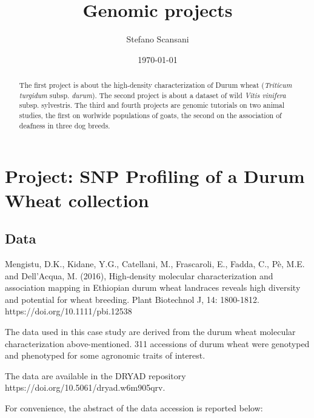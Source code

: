 \documentclass[a4paper,onecolumn,10pt]{article}
\begin{document}
\title{Genomic projects}
\author{Stefano Scansani}
\date{\today}
\maketitle
\begin{abstract}

    The first project is about the high-density characterization of Durum wheat (\textit{Triticum turgidum} subsp. \textit{durum}).
    The second project is about a dataset of wild \textit{Vitis vinifera} subsp. sylvestris.
    The third and fourth projects are genomic tutorials on two animal studies, the first on worlwide populations of goats, the second on the association of deafness in three dog breeds.

\end{abstract}
\tableofcontents
\listoffigures
\listoftables


\section{Project: SNP Profiling of a Durum Wheat collection}

\subsection{Data}

Mengistu, D.K., Kidane, Y.G., Catellani, M., Frascaroli, E., Fadda, C., Pè, M.E. and Dell'Acqua, M. (2016), High-density molecular characterization and association mapping in Ethiopian durum wheat landraces reveals high diversity and potential for wheat breeding. Plant Biotechnol J, 14: 1800-1812. https://doi.org/10.1111/pbi.12538

The data used in this case study are derived from the durum wheat molecular characterization above-mentioned.
311 accessions of durum wheat were genotyped and phenotyped for some agronomic traits of interest.

The data are available in the DRYAD repository https://doi.org/10.5061/dryad.w6m905qrv.

For convenience, the abstract of the data accession is reported below:
\end{document}
